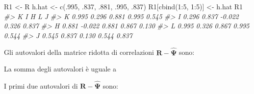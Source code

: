 \documentclass[
  11pt,
]{krantz}
\makeatletter
\newenvironment{Shaded}{\begin{snugshade}}{\end{snugshade}}
\newcommand{\CommentTok}[1]{\textcolor[rgb]{0.37,0.37,0.37}{\textit{#1}}}
\newcommand{\DecValTok}[1]{\textcolor[rgb]{0.06,0.06,0.06}{#1}}
\newcommand{\FunctionTok}[1]{\textcolor[rgb]{0,0,0}{#1}}
\newcommand{\NormalTok}[1]{#1}
\newcommand{\OtherTok}[1]{\textcolor[rgb]{0.37,0.37,0.37}{#1}}
\newcommand{\SpecialCharTok}[1]{\textcolor[rgb]{0,0,0}{#1}}
\newenvironment{kframe}{%
\medskip{}
\setlength{\fboxsep}{.8em}
 \def\at@end@of@kframe{}%
 \ifinner\ifhmode%
  \def\at@end@of@kframe{\end{minipage}}%
  \begin{minipage}{\columnwidth}%
 \fi\fi%
 \def\FrameCommand##1{\hskip\@totalleftmargin \hskip-\fboxsep
 \colorbox{shadecolor}{##1}\hskip-\fboxsep
     \hskip-\linewidth \hskip-\@totalleftmargin \hskip\columnwidth}%
 \MakeFramed {\advance\hsize-\width
   \@totalleftmargin\z@ \linewidth\hsize
   \@setminipage}}%
 {\par\unskip\endMakeFramed%
 \at@end@of@kframe}
\renewenvironment{Shaded}{\begin{kframe}}{\end{kframe}}
\theoremstyle{definition}
\theoremstyle{definition}
\theoremstyle{definition}
\theoremstyle{definition}
\theoremstyle{remark}
\makeatother
\begin{document}
\begin{Shaded}
\begin{Highlighting}[]
\NormalTok{R1 }\OtherTok{\textless{}{-}}\NormalTok{ R}
\NormalTok{h.hat }\OtherTok{\textless{}{-}} \FunctionTok{c}\NormalTok{(.}\DecValTok{995}\NormalTok{, .}\DecValTok{837}\NormalTok{, .}\DecValTok{881}\NormalTok{, .}\DecValTok{995}\NormalTok{, .}\DecValTok{837}\NormalTok{)}
\NormalTok{R1[}\FunctionTok{cbind}\NormalTok{(}\DecValTok{1}\SpecialCharTok{:}\DecValTok{5}\NormalTok{, }\DecValTok{1}\SpecialCharTok{:}\DecValTok{5}\NormalTok{)] }\OtherTok{\textless{}{-}}\NormalTok{ h.hat}
\NormalTok{R1}
\CommentTok{\#\textgreater{}       K      I      H     L     J}
\CommentTok{\#\textgreater{} K 0.995  0.296  0.881 0.995 0.545}
\CommentTok{\#\textgreater{} I 0.296  0.837 {-}0.022 0.326 0.837}
\CommentTok{\#\textgreater{} H 0.881 {-}0.022  0.881 0.867 0.130}
\CommentTok{\#\textgreater{} L 0.995  0.326  0.867 0.995 0.544}
\CommentTok{\#\textgreater{} J 0.545  0.837  0.130 0.544 0.837}
\end{Highlighting}
\end{Shaded}

Gli autovalori della matrice ridotta di correlazioni \(\textbf{R} - \hat{\boldsymbol{\Psi}}\) sono:

\begin{Shaded}
\end{Shaded}

La somma degli autovalori è uguale a

\begin{Shaded}
\end{Shaded}

I primi due autovalori di \(\textbf{R} - \hat{\boldsymbol{\Psi}}\) sono:

\begin{Shaded}
\end{Shaded}
\end{document}
